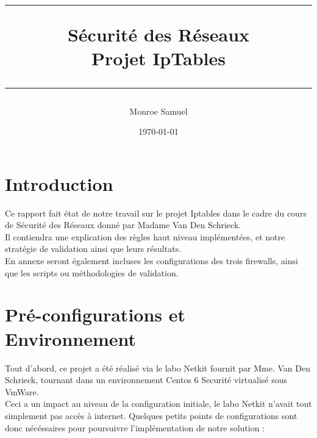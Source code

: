 \documentclass[a4paper,10pt,final,fleqn]{article}
\title{
\parbox{15cm}
{ %
  \vspace{3cm}
	\begin{center}\sf\bfseries\Huge
		\rule{15cm}{1pt}
		\medskip
		Sécurité des Réseaux \\
		\huge Projet IpTables
		\vspace{.5cm}
		\rule{15cm}{1pt}
	\end{center}
	\vspace{3cm}
 }}
\author{Monroe Samuel}
\date{\today}
\begin{document}
\maketitle
\newpage
\thispagestyle{empty}
\mbox{}

\section{Introduction}
	
	Ce rapport fait état de notre travail sur le projet Iptables dans le cadre du cours de Sécurité des Réseaux donné par Madame Van Den Schrieck.\\

	Il contiendra une explication des règles haut niveau implémentées, et notre stratégie de validation ainsi que leurs résultats.\\
	En annexe seront également incluses les configurations des trois firewalls, ainsi que les scripts ou méthodologies de validation.\\

\section{Pré-configurations et Environnement}

	Tout d'abord, ce projet a été réalisé via le labo Netkit fournit par Mme. Van Den Schrieck, tournant dans un environnement Centos 6 Securité virtualisé sous VmWare.\\

	Ceci a un impact au niveau de la configuration initiale, le labo Netkit n'avait tout simplement pas accès à internet. Quelques petits points de configurations sont donc nécéssaires pour poursuivre l'implémentation de notre solution : \\
\end{document}
